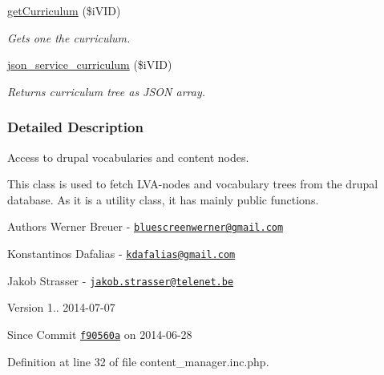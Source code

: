 \begin{DoxyCompactItemize}
\hyperlink{classcontent__manager_a0fccc30120c83ecc35b6a84b4654f2dc}{get\+Curriculum} (\$i\+V\+I\+D)
\begin{DoxyCompactList}\small\item\em Gets one the curriculum. \end{DoxyCompactList}\item 
\hyperlink{classcontent__manager_abe8407588c7195d203e7df5ff53fb373}{json\+\_\+service\+\_\+curriculum} (\$i\+V\+I\+D)
\begin{DoxyCompactList}\small\item\em Returns curriculum tree as J\+S\+O\+N array. \end{DoxyCompactList}\end{DoxyCompactItemize}


\subsubsection{Detailed Description}
Access to drupal vocabularies and content nodes. 

This class is used to fetch L\+V\+A-\/nodes and vocabulary trees from the drupal database. As it is a utility class, it has mainly {\ttfamily public} functions.

\begin{DoxyAuthor}{Authors}
Werner Breuer -\/ \href{mailto:bluescreenwerner@gmail.com}{\tt bluescreenwerner@gmail.\+com} 

Konstantinos Dafalias -\/ \href{mailto:kdafalias@gmail.com}{\tt kdafalias@gmail.\+com} 

Jakob Strasser -\/ \href{mailto:jakob.strasser@telenet.be}{\tt jakob.\+strasser@telenet.\+be} 
\end{DoxyAuthor}
\begin{DoxyVersion}{Version}
1.. 2014-\/07-\/07 
\end{DoxyVersion}
\begin{DoxySince}{Since}
Commit \href{http://github.com/TheJake123/DrupalModul/commit/f90560aa796b39853beb42a521d6d94c86051c46}{\tt f90560a} on 2014-\/06-\/28 
\end{DoxySince}


Definition at line 32 of file content\+\_\+manager.\+inc.\+php.




